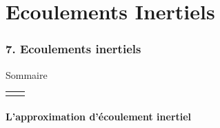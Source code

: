
\part{Ecoulements Inertiels}


\section*{\bfseries 7. Ecoulements inertiels}

\begin{frame}{Sommaire}
\small
  
\hspace*{2mm}
\begin{tabular}{cc}
  		\begin{minipage}{62mm}
  			\tableofcontents
      \vspace{15mm}
  		\end{minipage}
  		&   
  		\begin{minipage}{60cm}
		  \vspace*{-5mm}  
  		\end{minipage}
  	\end{tabular}

\vspace{0mm}

\end{frame}


\subsection{L'approximation d'écoulement inertiel}

